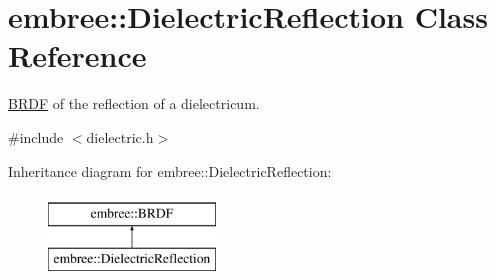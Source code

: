 \hypertarget{classembree_1_1_dielectric_reflection}{
\section{embree::DielectricReflection Class Reference}
\label{classembree_1_1_dielectric_reflection}
}


\hyperlink{classembree_1_1_b_r_d_f}{BRDF} of the reflection of a dielectricum.  




{\ttfamily \#include $<$dielectric.h$>$}

Inheritance diagram for embree::DielectricReflection:\begin{figure}[H]
\begin{center}
\leavevmode
\includegraphics[height=2.000000cm]{classembree_1_1_dielectric_reflection}
\end{center}
\end{figure}

